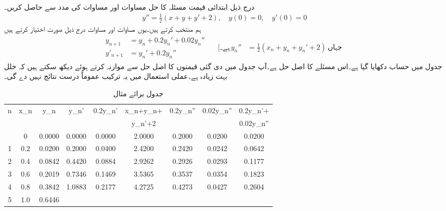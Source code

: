 \quad {}\\
درج ذیل ابتدائی قیمت مسئلہ کا حل مساوات  اور مساوات  کی مدد سے حاصل کریں۔
\begin{align*}
y''=\tfrac{1}{2}(x+y+y'+2),\quad y(0)=0,\quad y'(0)=0
\end{align*}
ہم  منتخب کرتے ہیں۔یوں مساوات  اور مساوات  درج ذیل صورت اختیار کرتے ہیں
\begin{gather*}
\begin{aligned}
y_{n+1}&=y_n+0.2y_n'+0.02y_n''\\
y'_{n+1}&=y_n'+0.2y_n''
\end{aligned}\quad
\begin{aligned}
[\text{ہے۔}\, y_n''&=\tfrac{1}{2}(x_n+y_n+y_n'+2) \, \text{جہاں}\
\end{aligned}
\end{gather*}
جدول  میں حساب دکھایا گیا ہے۔اس مسئلے کا اصل حل  ہے۔آپ جدول میں دی گئی قیمتوں کا اصل حل سے موازنہ کرتے ہوئے  دیکھ سکتے ہیں کہ خلل بہت زیادہ ہے۔عملی استعمال میں یہ ترکیب عموماً  درست نتائج نہیں دے گی۔
\begin{table}
\caption{جدول برائے مثال }
\label{جدول_مثال_اعدادی_دو_درجی_سادہ_الف}
\centering

\begin{tabular}{|C|C|C|C|C|C|C|C|C|}
\hline
n&x_n&y_n&y_n'&0.2y_n'&x_n+y_n+&0.2y_n''&0.02y_n''&0.2y_n'+\\
&&&&&\phantom{x_n+}y_n'+2&&&\phantom{0.0}0.02y_n''\\
\hline{}&0&0.0000&0.0000&0.0000&2.0000&0.2000&0.0200&0.0200\\
1&0.2&0.0200&0.2000&0.0400&2.4200&0.2420&0.0242&0.0642\\
2&0.4&0.0842&0.4420&0.0884&2.9262&0.2926&0.0293&0.1177\\
3&0.6&0.2019&0.7346&0.1469&3.5365&0.3537&0.0354&0.1823\\
4&0.8&0.3842&1.0883&0.2177&4.2725&0.4273&0.0427&0.2604\\
5&1.0&0.6446&&&&&&\\
\hline
\end{tabular}

\end{table}

